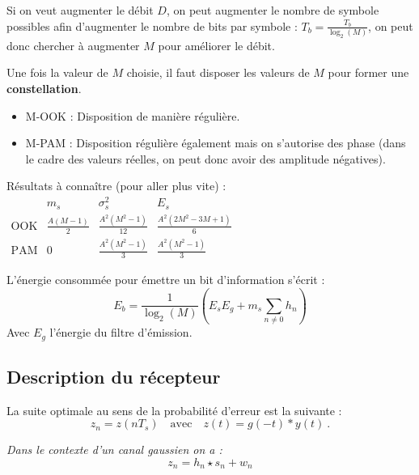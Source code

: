 	\begin{pop}
	Si on veut augmenter le débit $D$, on peut augmenter le nombre de symbole possibles afin d'augmenter le nombre de bits par symbole : $T_{b}= \frac{T_{b}}{\log_{2}(M)}$, on peut donc chercher à augmenter $M$ pour améliorer le débit.
	\end{pop}
	
	\begin{pop}
		Une fois la valeur de $M$ choisie, il faut disposer les valeurs de $M$ pour former une \textbf{constellation}.
		\begin{itemize}
		\item M-OOK : Disposition de manière régulière.
		\item M-PAM : Disposition régulière également mais on s'autorise des phase (dans le cadre des valeurs réelles, on peut donc avoir des amplitude négatives). 
		\end{itemize}
	\end{pop}

	\begin{pop}
		Résultats à connaître (pour aller plus vite) :
		$\begin{array}{c|ccc}
		           & m_s                & \sigma_s^2               & E_s \\ \hline
		\text{OOK} & \frac{A(M - 1)}{2} & \frac{A^2 (M^2 - 1)}{12} & \frac{A^2(2M^2 - 3M + 1)}{6} \\
		\text{PAM} & 0                  & \frac{A^2 (M^2 - 1)}{3}  & \frac{A^{2}(M^{2}-1)}{3}
		\end{array}$
	\end{pop}
	
	\begin{pop}
		L'énergie consommée pour émettre un bit d'information s'écrit :
		$$E_b = \frac{1}{\log_{2}(M)} \left( E_{s}E_{g}+m_{s} \sum_{n\neq 0} h_{n} \right)$$
		Avec $E_g$ l'énergie du filtre d'émission.
	\end{pop}

\subsection{Description du récepteur}

	\begin{pop}
		La suite optimale au sens de la probabilité d'erreur est la suivante :
		$$z_{n} = z(nT_{s}) \quad \text{avec} \quad z(t)=g(-t)*y(t)\ .$$
	\end{pop}
	
	\begin{pop}
	\textit{Dans le contexte d'un canal gaussien on a : }
	$$z_{n} = h_{n} \star s_{n} + w_{n}$$
	\end{pop}
	
